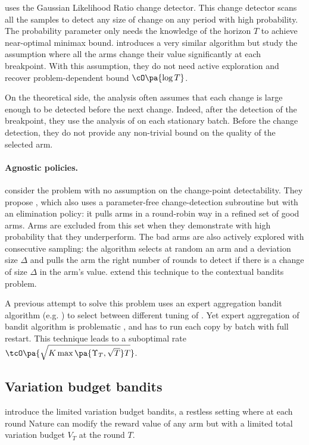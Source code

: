 \GLRUCB \citep{besson2019generalized} uses the Gaussian Likelihood Ratio change detector. This change detector scans all the samples to detect any size of change on any period with high probability. The probability parameter only needs the knowledge of the horizon $T$ to achieve near-optimal minimax bound. \citet{mukherjee2019distribution} introduces a very similar algorithm but study the assumption where all the arms change their value significantly at each breakpoint. With this assumption, they do not need active exploration and recover problem-dependent bound $\cO\pa{\log{T}}$.

On the theoretical side, the analysis often assumes that each change is large enough to be detected before the next change. Indeed, after the detection of the breakpoint, they use the analysis of \UCB on each stationary batch. Before the change detection, they do not provide any non-trivial bound on the quality of the selected arm. 


\paragraph{Agnostic policies.}
\citet{auer2019adaptively} consider the problem with no assumption on the change-point detectability. They propose \ADSWITCH, which also uses a parameter-free change-detection subroutine but with an elimination policy: it pulls arms in a round-robin way in a refined set of good arms. Arms are excluded from this set when they demonstrate with high probability that they underperform. The bad arms are also actively explored with consecutive sampling: the algorithm selects at random an arm and a deviation size $\Delta$ and pulls the arm the right number of rounds to detect if there is a change of size $\Delta$ in the arm's value. \citet{chen2019new} extend this technique to the contextual bandits problem.

A previous attempt \citep{cheung2019new} to solve this problem uses an expert aggregation bandit algorithm (e.g. \EXPfour) to select between different tuning of \SWUCB . Yet expert aggregation of bandit algorithm is problematic \citep{agarwal2017corralling, besson2018aggregation}, and \citet{cheung2019new} has to run each copy by batch with full restart. This technique leads to a suboptimal rate $\tcO\pa{\sqrt{K \max\pa{\Upsilon_T, \sqrt{T}} T}}$.


\subsection{Variation budget bandits}
\label{subsec:variation}
\citet{besbes2014stochastic} introduce the limited variation budget bandits, a restless setting where at each round Nature can modify the reward value of any arm but with a limited total variation budget $V_T$ at the round $T$. 

